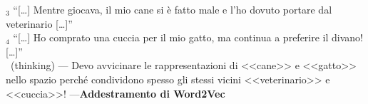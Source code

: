 \begin{frame}[t,fragile]
{{\begin{minipage}[t]{.7\textwidth}
{{			\alert{\faFile$_3$} ``[\ldots] Mentre giocava, il mio \alert{cane} si è fatto male e l'ho dovuto portare dal \alert{veterinario} [\ldots]''\\
			\alert{\faFile$_4$} ``[\ldots] Ho comprato una \alert{cuccia} per il mio \alert{gatto}, ma continua a preferire il divano! [\ldots]''\\
			\alert{\faTerminal\ (thinking)} --- Devo avvicinare le rappresentazioni di <<cane>> e <<gatto>> nello spazio perché condividono spesso gli stessi vicini <<veterinario>> e <<cuccia>>! ---}}{\textbf{Addestramento di Word2Vec}}
		\end{minipage}
		}
	}
\end{frame}
%
